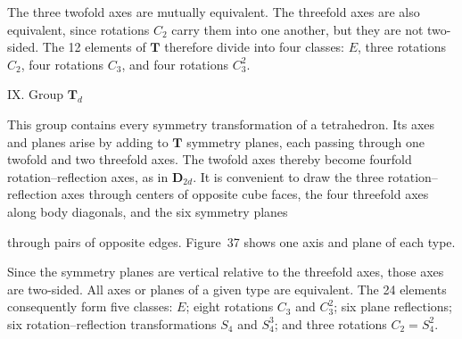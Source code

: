 \begin{figure}[ht]
\centering
{}
\caption{}
\label{fig:93-36}
\end{figure}

The three twofold axes are mutually equivalent. The threefold axes are also equivalent, since rotations $C_2$ carry them into one another, but they are not two-sided. The 12 elements of $\boldsymbol{T}$ therefore divide into four classes: $E$, three rotations $C_2$, four rotations $C_3$, and four rotations $C_3^2$.

\medskip
\noindent IX. Group $\boldsymbol{T}_d$

This group contains every symmetry transformation of a tetrahedron. Its axes and planes arise by adding to $\boldsymbol{T}$ symmetry planes, each passing through one twofold and two threefold axes. The twofold axes thereby become fourfold rotation--reflection axes, as in $\boldsymbol{D}_{2d}$. It is convenient to draw the three rotation--reflection axes through centers of opposite cube faces, the four threefold axes along body diagonals, and the six symmetry planes

through pairs of opposite edges. Figure~37 shows one axis and plane of each type.

Since the symmetry planes are vertical relative to the threefold axes, those axes are two-sided. All axes or planes of a given type are equivalent. The 24 elements consequently form five classes: $E$; eight rotations $C_3$ and $C_3^2$; six plane reflections; six rotation--reflection transformations $S_4$ and $S_4^3$; and three rotations $C_2=S_4^2$.

